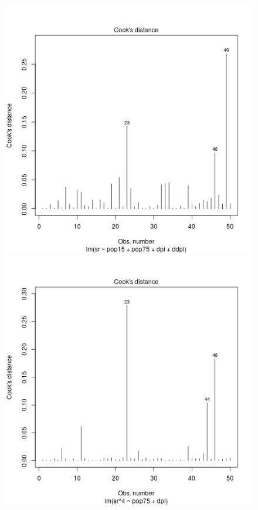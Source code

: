 \begin{figure}[p]
  \begin{center}
    \includegraphics[scale=0.4]{plot14.png} \hspace*{2cm} \includegraphics[scale=0.4]{plot24.png} \\

\end{center}
\end{figure}
